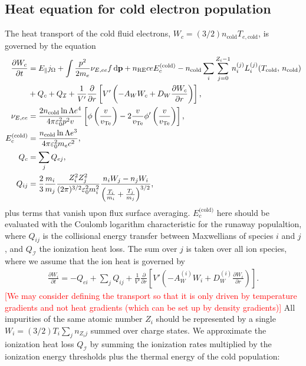 \documentclass[11pt,a4paper]{article}
\newcommand{\rd}{\ensuremath{\mathrm{d}}}
\newcommand{\sub}[1]{\ensuremath{_{\text{#1}}}}
\renewcommand{\b}[1]{\ensuremath{ {\bf #1 } }}
\begin{document}
\subsection{Heat equation for cold electron population}
The heat transport of the cold fluid electrons, $W_c = (3/2)n\sub{cold}T_{e,\text{cold}}$, is governed by the equation
\begin{align}
\frac{\partial W_c}{\partial t} &= E_\parallel j_\Omega + \int  \frac{p^2}{2m_e}\nu_{E,ee} f \,\rd \b{p}  + n\sub{RE} ceE_c^\text{(cold)} -n\sub{cold} \sum_i \sum_{j=0}^{Z_i-1} n_i^{(j)} L_{i}^{(j)}(T\sub{cold},\,n\sub{cold})  \nonumber \\
&+ Q_c +Q_\mathcal{I} +  \frac{1}{V'}\frac{\partial}{\partial r}\left[V'\left(-A_W W_c + D_W\frac{\partial W_c}{\partial r}\right)\right], \nonumber \\
\nu_{E,ee} &= \frac{2 n\sub{cold}\ln\Lambda e^4}{4\pi\varepsilon_0^2 p^2 v} \left[\phi\left(\frac{v}{v\sub{Te}}\right) - 2\frac{v}{v\sub{Te}}\phi'\left(\frac{v}{v\sub{Te}}\right)\right], \nonumber \\
E_c^\text{(cold)} &= \frac{n\sub{cold}\ln\Lambda e^3}{4\pi\varepsilon_0^2 m_e c^2}, \nonumber \\
Q_c &= \sum_j Q_{ej}, \nonumber\\
Q_{ij} &= \frac{2}{3}\frac{m_i}{m_j} \frac{Z_i^2 Z_j^2}{(2\pi)^{3/2}\varepsilon_0^2 m_i^2}\frac{n_iW_j-n_jW_i}{\left(\frac{T_i}{m_i}+\frac{T_j}{m_j}\right)^{3/2}},
\end{align}
plus terms that vanish upon flux surface averaging. $E_c^\text{(cold)}$ here should be evaluated with the Coulomb logarithm characteristic for the runaway populaltion, where $Q_{ij}$ is the collisional energy transfer between Maxwellians of species $i$ and $j$, and $Q_\mathcal{I}$ the ionization heat loss. The sum over $j$ is taken over all ion species, where we assume that the ion heat is governed by 
\begin{align}
\frac{\partial W_i}{\partial t} = -Q_{ei} + \sum_j Q_{ij} +\frac{1}{V'}\frac{\partial}{\partial r}\left[V'\left(-A_W^{(i)} W_i + D_W^{(i)}\frac{\partial W_i}{\partial r}\right)\right].
\end{align}
\textcolor{red}{[We may consider defining the transport so that it is only driven by temperature gradients and not heat gradients (which can be set up by density gradients)]} All impurities of the same atomic number $Z_i$ should be represented by a single $W_i = (3/2)T_i \sum_j n_{{Z_i}j}$ summed over charge states. We approximate the ionization heat loss $Q_\mathcal{I}$ by summing the ionization rates multiplied by the ionization energy thresholds plus the thermal energy of the cold population:
\end{document}
